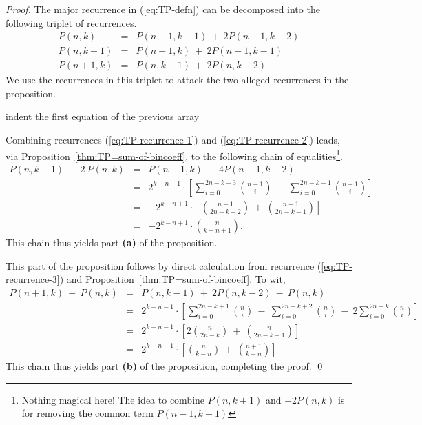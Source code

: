\begin{proof}
The major recurrence in (\ref{eq:TP-defn}) can be decomposed into the
following triplet of recurrences.
\begin{eqnarray}
\label{eq:TP-recurrence-1}
P(n, k)   & = & P(n-1, k-1) \ + \ 2 P(n-1, k-2) \\
\label{eq:TP-recurrence-2}
P(n, k+1) & = & P(n-1, k) \ + \ 2 P(n-1, k-1) \\
\label{eq:TP-recurrence-3}
P(n+1, k) & = & P(n, k-1) \ + \ 2 P(n, k-2)
\end{eqnarray}
We use the recurrences in this triplet to attack the two alleged
recurrences in the proposition.

{\Denis indent the first equation of the previous array}
\medskip

Combining recurrences (\ref{eq:TP-recurrence-1}) and
(\ref{eq:TP-recurrence-2}) leads, via
Proposition~\ref{thm:TP=sum-of-bincoeff}, to the following chain of
equalities\footnote{Nothing magical here! The idea to combine $P(n, k+1)$ and $-2 P(n, k)$
is for removing the common term $P(n-1, k-1)$}.
\begin{eqnarray*}
P(n, k+1) \ - \ 2 \ P(n, k)
  & = &
P(n-1, k) \ - \ 4 P(n-1, k-2) \\
  & = &
2^{k-n+1} \cdot \left[
\sum_{i=0}^{2n-k-3} {{n-1} \choose i} \ - \
\sum_{i=0}^{2n-k-1} {{n-1} \choose i}
\right] \\
  & = & 
- 2^{k-n+1} \cdot \left[
{{n-1} \choose {2n-k-2}} \ + \ {{n-1} \choose {2n-k-1}}
\right] \\
  & = &
- 2^{k-n+1} \cdot {n \choose k-n+1}.
\end{eqnarray*}
This chain thus yields part {\bf (a)} of the proposition.

\medskip

This part of the proposition follows by direct calculation from
recurrence (\ref{eq:TP-recurrence-3}) and
Proposition~\ref{thm:TP=sum-of-bincoeff}.  To wit,
\begin{eqnarray*}
P(n+1, k) \ - \ P(n, k)
  & = &
P(n, k-1) \ + \ 2 P(n, k-2) \ - \ P(n,k) \\
  & = &
2^{k-n-1} \cdot \left[
\sum_{i=0}^{2n-k+1} {n \choose i}
 \ - \ \sum_{i=0}^{2n-k+2} {n \choose i}
 \ - \ 2 \sum_{i=0}^{2n-k} {n \choose i}
\right] \\
  & = & 
2^{k-n-1} \cdot \left[
  2 {n \choose {2n-k}} \ + \ {n \choose {2n-k+1}} \right] \\
  & = &
2^{k-n-1} \cdot \left[
   {n \choose {k-n}} \ + \ {{n+1} \choose {k-n}} \right]
\end{eqnarray*}
This chain thus yields part {\bf (b)} of the proposition, completing
the proof.
\qed
\end{proof}

